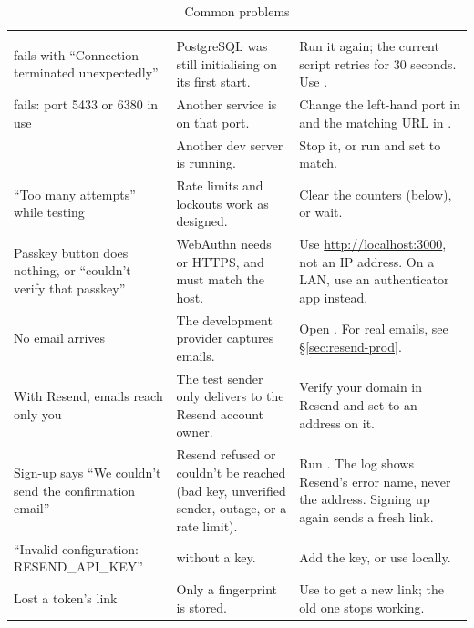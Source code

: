 \begin{longtable}{@{}L{4.6cm}L{4.4cm}p{6.3cm}@{}}
\caption{Common problems}\label{tab:trouble}\\
\toprule
{} &  &  \\
\midrule\endfirsthead
\toprule
{} &  &  \\
\midrule\endhead
{} fails with ``Connection terminated unexpectedly'' & PostgreSQL was still initialising on its first start. & Run it again; the current script retries for 30 seconds. Use . \\
 fails: port 5433 or 6380 in use & Another service is on that port. & Change the left-hand port in  and the matching URL in . \\
 & Another dev server is running. & Stop it, or run  and set  to match. \\
``Too many attempts'' while testing & Rate limits and lockouts work as designed. & Clear the counters (below), or wait. \\
Passkey button does nothing, or ``couldn't verify that passkey'' & WebAuthn needs  or HTTPS, and  must match the host. & Use \url{http://localhost:3000}, not an IP address. On a LAN, use an authenticator app instead. \\
No email arrives & The development provider captures emails. & Open . For real emails, see §\ref{sec:resend-prod}. \\
With Resend, emails reach only you & The test sender  only delivers to the Resend account owner. & Verify your domain in Resend and set  to an address on it. \\
Sign-up says ``We couldn't send the confirmation email'' & Resend refused or couldn't be reached (bad key, unverified sender, outage, or a rate limit). & Run . The log shows Resend's error name, never the address. Signing up again sends a fresh link. \\
``Invalid configuration: RESEND\_API\_KEY'' &  without a key. & Add the key, or use  locally. \\
Lost a token's link & Only a fingerprint is stored. & Use  to get a new link; the old one stops working. \\

\end{longtable}
